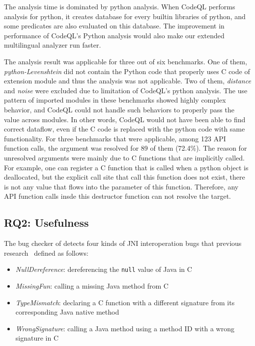 The analysis time is dominated by python analysis.  When CodeQL performs
analysis for python, it creates database for every builtin libraries of python,
and some predicates are also evaluated on this database. The improvement in
performance of CodeQL's Python analysis would also make our extended
multilingual analyzer run faster.

The analysis result was applicable for three out of six benchmarks.
One of them, {\it python-Levenshtein} did not contain the Python code
that properly uses C code of extension module and thus the analysis was not applicable.
Two of them, {\it distance} and {\it noise} were excluded due to limitation
of CodeQL's python analysis. The use pattern of imported modules in these benchmarks
showed highly complex behavior, and CodeQL could not handle such behaviors to properly pass the value
across modules. In other words, CodeQL would not have been able to find correct dataflow, even
if the C code is replaced with the python code with same functionality.
For three benchmarks that were applicable, among 123 API function calls, the argument was
resolved for 89 of them (72.4\%). The reason for unresolved arguments were
mainly due to C functions that are implicitly called. For example, one can register
a C function that is called when a python object is deallocated, but the explicit
call site that call this function does not exist, there is not any value that
flows into the parameter of this function. Therefore, any API function calls insde this
destructor function can not resolve the target.


\subsection{RQ2: Usefulness}

The bug checker of \ours detects four kinds of JNI interoperation bugs
that previous research~\cite{ILEA, LeeASE20} defined as follows:

\begin{itemize}
  \item {\it NullDereference}: dereferencing the {\tt null} value of Java in C
  \item {\it MissingFun}: calling a missing Java method from C
  \item {\it TypeMismatch}: declaring a C function with a different signature
    from its corresponding Java native method
  \item {\it WrongSignature}: calling a Java method using a method ID with a
    wrong signature in C
\end{itemize}


